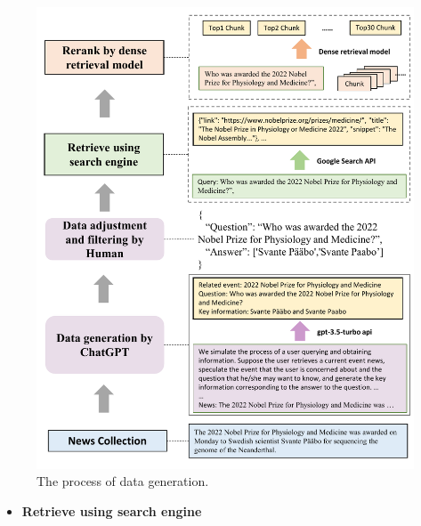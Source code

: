 \documentclass{beamer}
\begin{document}
\begin{frame}
    \begin{figure}[h]
        \centering
        \includegraphics[height=.75\textheight]{./images/figures/data.pdf}
        \caption{The process of data generation.}
    \end{figure}
    \begin{itemize}
        \item {\bfseries{Retrieve using search engine}}
    \end{itemize}
\end{frame}
\end{document}
